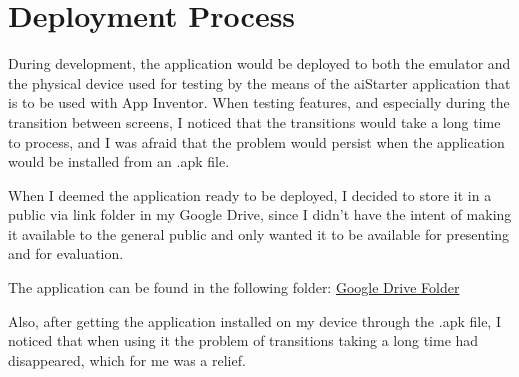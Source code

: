 \chapter{Deployment Process}
During development, the application would be deployed to both the emulator and the physical device used for testing by the means of the aiStarter application that is to be used with App Inventor. When testing features, and especially during the transition between screens, I noticed that the transitions would take a long time to process, and I was afraid that the problem would persist when the application would be installed from an .apk file.

When I deemed the application ready to be deployed, I decided to store it in a public via link folder in my Google Drive, since I didn't have the intent of making it available to the general public and only wanted it to be available for presenting and for evaluation.

The application can be found in the following folder:
\href{https://drive.google.com/drive/folders/1HNkbFOtjvBkk_PaII-yi2_qwW6sVlULS}{Google Drive Folder}

Also, after getting the application installed on my device through the .apk file, I noticed that when using it the problem of transitions taking a long time had disappeared, which for me was a relief.
